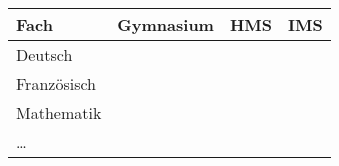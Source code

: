\documentclass{standalone}
\begin{document}
\begin{tabular}{|l|c|c|c|}
    \hline
    \textbf{Fach} & \textbf{Gymnasium} & \textbf{HMS} & \textbf{IMS} \\
    \hline
    Deutsch&&&\\
    \hline
    Französisch&&&\\
    \hline
    Mathematik&&&\\
    \hline
    \dots&&&\\
    \hline
    
\end{tabular}
\end{document}
